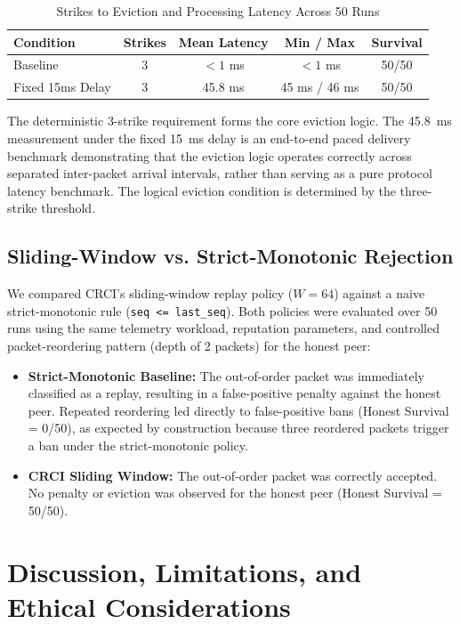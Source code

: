 \documentclass[conference]{IEEEtran}
\begin{document}
\begin{table}[htbp]
\caption{Strikes to Eviction and Processing Latency Across 50 Runs}
\label{tab:latency}
\centering
\begin{tabular}{lcccc}
\toprule
\textbf{Condition} & \textbf{Strikes} & \textbf{Mean Latency} & \textbf{Min / Max} & \textbf{Survival} \\
\midrule
Baseline & 3 & $< 1$ ms & $< 1$ ms & 50/50 \\
Fixed 15ms Delay & 3 & 45.8 ms & 45 ms / 46 ms & 50/50 \\
\bottomrule
\end{tabular}
\end{table}

The deterministic 3-strike requirement forms the core eviction logic. The 45.8~ms measurement under the fixed 15~ms delay is an end-to-end paced delivery benchmark demonstrating that the eviction logic operates correctly across separated inter-packet arrival intervals, rather than serving as a pure protocol latency benchmark. The logical eviction condition is determined by the three-strike threshold.

\subsection{Sliding-Window vs. Strict-Monotonic Rejection}
We compared CRCI's sliding-window replay policy ($W=64$) against a naive strict-monotonic rule (\texttt{seq <= last\_seq}). Both policies were evaluated over 50 runs using the same telemetry workload, reputation parameters, and controlled packet-reordering pattern (depth of 2 packets) for the honest peer:
\begin{itemize}
    \item \textbf{Strict-Monotonic Baseline:} The out-of-order packet was immediately classified as a replay, resulting in a false-positive penalty against the honest peer. Repeated reordering led directly to false-positive bans (Honest Survival = 0/50), as expected by construction because three reordered packets trigger a ban under the strict-monotonic policy.
    \item \textbf{CRCI Sliding Window:} The out-of-order packet was correctly accepted. No penalty or eviction was observed for the honest peer (Honest Survival = 50/50).
\end{itemize}

\section{Discussion, Limitations, and Ethical Considerations}
\label{sec:discussion}
\end{document}

